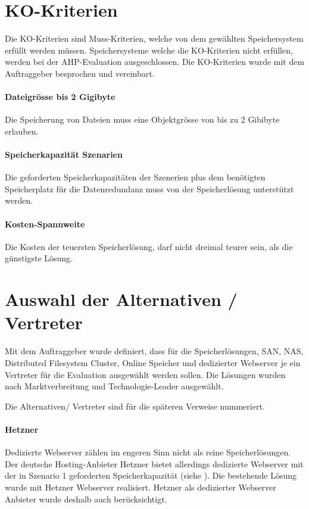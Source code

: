 \section{KO-Kriterien}
Die KO-Kriterien sind Muss-Kriterien, welche von dem gewählten Speichersystem erfüllt werden müssen. Speichersysteme welche die KO-Kriterien nicht erfüllen, werden bei der AHP-Evaluation ausgeschlossen. Die KO-Kriterien wurde mit dem Auftraggeber besprochen und vereinbart.

\setcounter{paragraph}{0}
\renewcommand\theparagraph{KO-\arabic{paragraph}}

\paragraph{Dateigrösse bis 2 Gigibyte}\label{KO-1}
Die Speicherung von Dateien muss eine Objektgrösse von bis zu 2 Gibibyte erlauben.

\paragraph{Speicherkapazität Szenarien}\label{KO-2}
Die geforderten Speicherkapazitäten der Szenerien plus dem benötigten Speicherplatz für die Datenredundanz muss von der Speicherlösung unterstützt werden.

\paragraph{Kosten-Spannweite}\label{KO-3}
Die Kosten der teuersten Speicherlösung, darf nicht dreimal teurer sein, als die günstigste Lösung.

\section{Auswahl der Alternativen / Vertreter}
Mit dem Auftraggeber wurde definiert, dass für die Speicherlösungen, SAN, NAS, Distributed Filesystem Cluster, Online Speicher und dedizierter Webserver je ein Vertreter für die Evaluation ausgewählt werden sollen. Die Lösungen wurden nach Marktverbreitung und Technologie-Leader ausgewählt.

Die Alternativen/ Vertreter sind für die späteren Verweise nummeriert.

\setcounter{paragraph}{0}
\renewcommand\theparagraph{Al-\arabic{paragraph}}
\paragraph{Hetzner}\label{Al-1}
Dedizierte Webserver zählen im engeren Sinn nicht als reine Speicherlösungen. Der deutsche Hosting-Anbieter Hetzner bietet allerdings dedizierte Webserver mit der in Szenario 1 geforderten Speicherkapazität (siehe ). Die bestehende Lösung wurde mit Hetzner Webserver realisiert. Hetzner als dedizierter Webserver Anbieter wurde deshalb auch berücksichtigt. 

